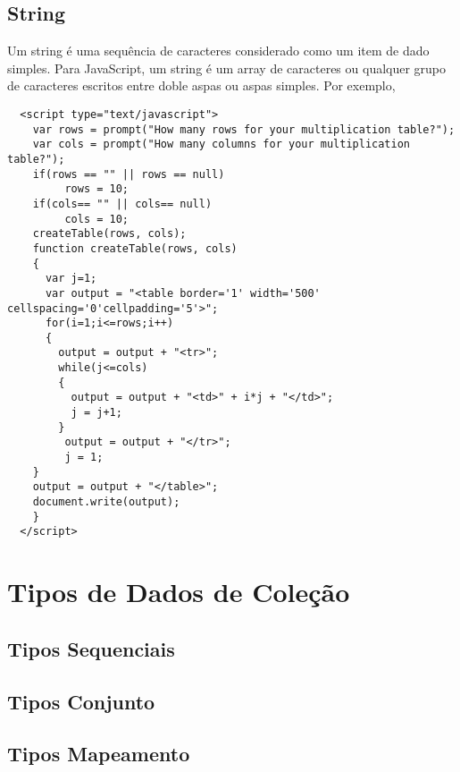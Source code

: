             \subsection{String}
            Um string \'{e} uma sequ\^{e}ncia de caracteres considerado como um item de dado simples. Para JavaScript, um string \'{e} um array de caracteres ou qualquer grupo de caracteres escritos entre doble aspas ou aspas simples. Por exemplo,
    \begin{lstlisting}
  <script type="text/javascript">
    var rows = prompt("How many rows for your multiplication table?");
    var cols = prompt("How many columns for your multiplication table?");
    if(rows == "" || rows == null)
   		 rows = 10;
    if(cols== "" || cols== null)
   		 cols = 10;
    createTable(rows, cols);
    function createTable(rows, cols)
    {
      var j=1;
      var output = "<table border='1' width='500' cellspacing='0'cellpadding='5'>";
      for(i=1;i<=rows;i++)
      {
    	output = output + "<tr>";
        while(j<=cols)
        {
  		  output = output + "<td>" + i*j + "</td>";
   		  j = j+1;
   		}
   		 output = output + "</tr>";
   		 j = 1;
    }
    output = output + "</table>";
    document.write(output);
    }
  </script>
\end{lstlisting}




    \section{Tipos de Dados de Cole\c{c}\~{a}o}


            \subsection{Tipos Sequenciais}


            \subsection{Tipos Conjunto}


            \subsection{Tipos Mapeamento}




